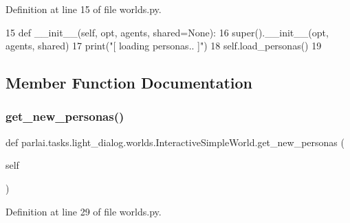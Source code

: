 Definition at line 15 of file worlds.\+py.


\begin{DoxyCode}
15     \textcolor{keyword}{def }\_\_init\_\_(self, opt, agents, shared=None):
16         super().\_\_init\_\_(opt, agents, shared)
17         print(\textcolor{stringliteral}{"[ loading personas.. ]"})
18         self.load\_personas()
19 
\end{DoxyCode}


\subsection{Member Function Documentation}
\mbox{\label{classparlai_1_1tasks_1_1light__dialog_1_1worlds_1_1InteractiveSimpleWorld_a41e6b37a44268fcaf08057d48d318be6}} 
\subsubsection{\texorpdfstring{get\+\_\+new\+\_\+personas()}{get\_new\_personas()}}
{\footnotesize\ttfamily def parlai.\+tasks.\+light\+\_\+dialog.\+worlds.\+Interactive\+Simple\+World.\+get\+\_\+new\+\_\+personas (\begin{DoxyParamCaption}\item[{}]{self }\end{DoxyParamCaption})}



Definition at line 29 of file worlds.\+py.


